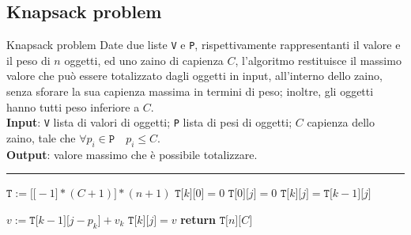 \documentclass[a4paper, 12pt]{report}
\begin{document}
    \subsection{Knapsack problem}

    \begin{framedalgo}[breakable]{Knapsack problem}
        Date due liste \texttt{V} e \texttt{P}, rispettivamente rappresentanti il valore e il peso di $n$ oggetti, ed uno zaino di capienza $C$, l'algoritmo restituisce il massimo valore che può essere totalizzato dagli oggetti in input, all'interno dello zaino, senza sforare la sua capienza massima in termini di peso; inoltre, gli oggetti hanno tutti peso inferiore a $C$.\\
        \textbf{Input}: \texttt{V} lista di valori di oggetti; \texttt{P} lista di pesi di oggetti; $C$ capienza dello zaino, tale che $\forall p_i \in \texttt{P} \quad p_i \le C$.\\
        \textbf{Output}: valore massimo che è possibile totalizzare.

        \hrule
        \begin{algorithmic}[1]
                \State $\texttt{T} := \texttt{[[}-1\texttt{]} * (C + 1) \texttt{]} * (n + 1)$
                 
                    \State $\texttt{T[} k\texttt{][}0\texttt{]} = 0$ 
                \EndFor
                 
                    \State $\texttt{T[} 0\texttt{][}j\texttt{]} = 0$ 
                \EndFor
                        \State $\texttt{T[}k\texttt{][}j\texttt{]} = \texttt{T[}k -1 \texttt{][}j\texttt{]}$ 

                        \State $v := \texttt{T[}k-1\texttt{][}j-p_k\texttt{]} + v_k$
                            \State $\texttt{T[}k\texttt{][}j\texttt{]} = v$
                        \EndIf
                    \EndFor
                \EndFor
                \State \textbf{return} $\texttt{T[}n\texttt{][}C\texttt{]}$
            \EndFunction
        \end{algorithmic}
    \end{framedalgo}
\end{document}
